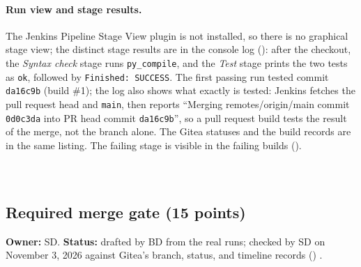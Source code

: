 \paragraph{Run view and stage results.} The Jenkins Pipeline Stage View plugin is not installed, so there is no graphical stage
view; the distinct stage results are in the console log (): after the checkout, the \emph{Syntax check} stage runs
\texttt{py\_compile}, and the \emph{Test} stage prints the two tests as \texttt{ok}, followed by \texttt{Finished: SUCCESS}. The first
passing run tested commit \texttt{da16c9b} (build \#1); the log also shows what exactly is tested: Jenkins fetches the pull
request head and \texttt{main}, then reports ``Merging remotes/origin/main commit \texttt{0d0c3da} into PR head commit
\texttt{da16c9b}'', so a pull request build tests the result of the merge, not the branch alone. The Gitea statuses and the build
records are in the same listing. The failing
stage is visible in the failing builds ().

\begin{longlisting}
\inputminted[fontsize=\scriptsize]{text}{evidence/70-local-test-run-pricing-example-2026-10-29.txt}
\caption{Local run of the course example before the first pull request, October 29, 2026 (real output).}
\label{Listing:E70}
\end{longlisting}

\begin{longlisting}
\inputminted[fontsize=\scriptsize]{text}{evidence/85-jenkins-pr10-build-1-console-and-gitea-commit-status-2026-11-02.txt}
\caption{Build \#1 of \texttt{PR-10} (commit \texttt{da16c9b}): console, stage commands, and the Gitea statuses (real output; console annotation blobs removed).}
\label{Listing:E85}
\end{longlisting}

\begin{longlisting}
\inputminted[fontsize=\scriptsize]{text}{evidence/108-clean-clone-test-run-main-a0094a8-sd-2026-11-03.txt}
\caption{Clean-run check by SD: fresh clone of \texttt{twintrack} at the merged commit \texttt{a0094a8}, the two pipeline commands, November 3, 2026 (real output).}
\label{Listing:E108}
\end{longlisting}

\subsection{Required merge gate (15 points)}
\label{Section:jenkGate}
\textbf{Owner:} SD. \textbf{Status:} drafted by BD from the real runs; checked by SD on November 3, 2026 against
Gitea's branch, status, and timeline records () \StatusPass.

